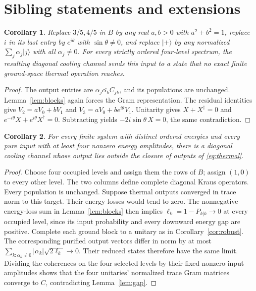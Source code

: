 \documentclass[11pt]{article}
\newtheorem{corollary}{Corollary}
\newcommand{\ket}[1]{\lvert #1\rangle}
\begin{document}
\section{Sibling statements and extensions}
\begin{corollary}\label{cor:family}
Replace $3/5,4/5$ in $B$ by any real $a,b>0$ with $a^2+b^2=1$, replace
$i$ in its last entry by $e^{i\theta}$ with $\sin\theta\ne0$, and replace
$\ket+$ by any normalized $\sum_j\alpha_j\ket j$ with all $\alpha_j\ne0$.
For every strictly ordered four-level spectrum, the resulting diagonal
cooling channel sends this input to a state that no exact finite
ground-space thermal operation reaches.
\end{corollary}
\begin{proof}
The output entries are $\alpha_j\overline{\alpha_k}C_{jk}$, and its
populations are unchanged. Lemma~\ref{lem:blocks} again forces the Gram
representation. The residual identities give
$V_2=aV_0+bV_1$ and $V_3=aV_0+be^{i\theta}V_1$.
Unitarity gives $X+X^\dagger=0$ and
$e^{-i\theta}X+e^{i\theta}X^\dagger=0$.
Subtracting yields $-2i\sin\theta\,X=0$, the same contradiction.
\end{proof}

\begin{corollary}\label{cor:dimensions}
For every finite system with distinct ordered energies and every pure
input with at least four nonzero energy amplitudes, there is a diagonal
cooling channel whose output lies outside the closure of outputs of
\eqref{eq:thermal}.
\end{corollary}
\begin{proof}
Choose four occupied levels and assign them the rows of $B$; assign
$(1,0)$ to every other level. The two columns define complete diagonal
Kraus operators. Every population is unchanged. Suppose thermal outputs
converged in trace norm to this target. Their energy losses would tend to zero.
The nonnegative energy-loss sum in Lemma~\ref{lem:blocks} then implies
$\ell_k=1-P_{k|k}\to0$ at every occupied level, since its input probability
and every downward energy gap are positive. Complete each ground block to a
unitary as in Corollary~\ref{cor:robust}. The corresponding purified output
vectors differ in norm by at most
$\sum_{k:\alpha_k\ne0}|\alpha_k|\sqrt{2\ell_k}\to0$.
Their reduced states therefore have the same limit. Dividing the coherences
on the four selected levels by their fixed nonzero input amplitudes shows
that the four unitaries' normalized trace Gram matrices converge to $C$,
contradicting Lemma~\ref{lem:gap}.
\end{proof}
\end{document}
